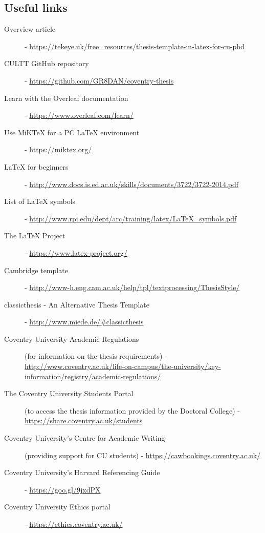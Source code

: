 \subsection*{Useful links}
\begin{description}
\item[Overview article] - \url{https://tekeye.uk/free_resources/thesis-template-in-latex-for-cu-phd}
\item[CULTT GitHub repository] - \url{https://github.com/GR8DAN/coventry-thesis}
\item[Learn with the Overleaf documentation] - \url{https://www.overleaf.com/learn/}
\item[Use MiKTeX for a PC \LaTeX{} environment] - \url{https://miktex.org/}
\item[\LaTeX{} for beginners] - \url{http://www.docs.is.ed.ac.uk/skills/documents/3722/3722-2014.pdf}
\item[List of LaTeX symbols] - \url{http://www.rpi.edu/dept/arc/training/latex/LaTeX_symbols.pdf}
\item[The \LaTeX{} Project] - \url{https://www.latex-project.org/}
\item[Cambridge template] - \url{http://www-h.eng.cam.ac.uk/help/tpl/textprocessing/ThesisStyle/}
\item[classicthesis - An Alternative Thesis Template] - \url{http://www.miede.de/#classicthesis}
\item[Coventry University Academic Regulations] (for information on the thesis requirements)
- \url{http://www.coventry.ac.uk/life-on-campus/the-university/key-information/registry/academic-regulations/}
\item[The Coventry University Students Portal] (to access the thesis information provided by the Doctoral College)
- \url{https://share.coventry.ac.uk/students}
\item[Coventry University's Centre for Academic Writing] (providing support for CU students) - \url{https://cawbookings.coventry.ac.uk/}
\item[Coventry University's Harvard Referencing Guide]
- \url{https://goo.gl/9jxdPX}
\item[Coventry University Ethics portal] - \url{https://ethics.coventry.ac.uk/}
\end{description}
